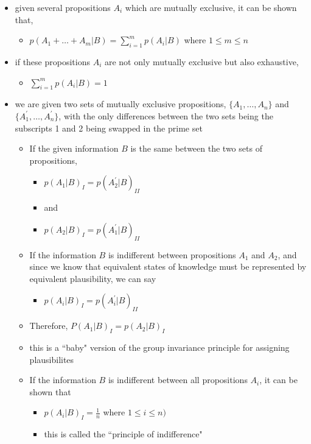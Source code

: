 \documentclass[../jaynes_prob_theory_notes.tex]{subfiles}
\begin{document}
\begin{itemize}
    \item given several propositions $A_i$ which are mutually exclusive, it can be shown that,
        \begin{itemize}
            \item[] $p(A_1 + \ldots + A_m|B) = \sum^m_{i=1} p(A_i|B)$ where $1 \leq m \leq n$
        \end{itemize}

    \item if these propositions $A_i$ are not only mutually exclusive but also exhaustive,
        \begin{itemize}
            \item[] $\sum^m_{i=1} p(A_i|B) = 1$
        \end{itemize}

    \item we are given two sets of mutually exclusive propositions, $\{A_1, \ldots, A_n\}$ and $\{A_1^{\prime}, \ldots, A_n^{\prime}\}$, with the only differences between the two sets being the subscripts 1 and 2 being swapped in the prime set
        \begin{itemize}
            \item If the given information $B$ is the same between the two sets of propositions,
                \begin{itemize}
                    \item[] $p(A_1|B)_I = p(A_2^{\prime}|B)_{II}$
                    \item[] and
                    \item[] $p(A_2|B)_I = p(A_1^{\prime}|B)_{II}$
                \end{itemize}
            \item If the information $B$ is indifferent between propositions $A_1$ and $A_2$, and since we know that equivalent states of knowledge must be represented by equivalent plausibility, we can say
                \begin{itemize}
                    \item[] $p(A_i|B)_I = p(A_i^{\prime}|B)_{II}$
                \end{itemize}
            \item Therefore, $P(A_1|B)_I = p(A_2|B)_I$
            \item this is a ``baby" version of the group invariance principle for assigning plausibilites
            \item If the information $B$ is indifferent between all propositions $A_i$, it  can be shown that 
                \begin{itemize}
                    \item[] $p(A_i|B)_I = \frac{1}{n}$ where $1 \leq i \leq n)$
                    \item this is called the ``principle of indifference"
                \end{itemize}
        \end{itemize}
        

\end{itemize}
\end{document}
